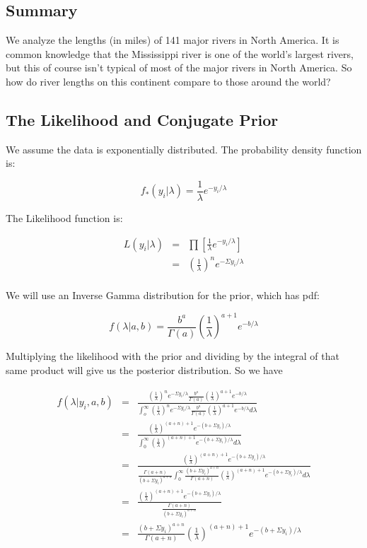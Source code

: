 \documentclass[12pt]{article}
\begin{document}
\subsection{Summary}

\noindent We analyze the lengths (in miles) of 141 major rivers in North America.  It is common knowledge that the Mississippi river is one of the world's largest rivers, but this of course isn't typical of most of the major rivers in North America.  So how do river lengths on this continent compare to those around the world?

\subsection{The Likelihood and Conjugate Prior}

\noindent We assume the data is exponentially distributed.  The probability density function is:

\[f_*(y_i|\lambda)=\frac{1}{\lambda}e^{-y_i/\lambda} \]

\noindent The Likelihood function is:

\begin{eqnarray*}
L(y_i|\lambda) &=& \prod\left[\frac{1}{\lambda}e^{-y_i/\lambda}\right] \\
&=& \left(\frac{1}{\lambda}\right)^ne^{-\Sigma y_i/\lambda} \\
\end{eqnarray*}

\noindent We will use an Inverse Gamma distribution for the prior, which has pdf:

\[f(\lambda|a,b)=\frac{b^a}{\Gamma(a)}\left(\frac{1}{\lambda}\right)^{a+1}e^{-b/\lambda}\]

\noindent Multiplying the likelihood with the prior and dividing by the integral of that same product will give us the posterior distribution.  So we have

\begin{eqnarray*}
f(\lambda|y_i,a,b) &=& \frac{\left(\frac{1}{\lambda}\right)^ne^{-\Sigma y_i/\lambda}\frac{b^a}{\Gamma(a)}\left(\frac{1}{\lambda}\right)^{a+1}e^{-b/\lambda}}{\int_o^\infty \left(\frac{1}{\lambda}\right)^ne^{-\Sigma y_i/\lambda}\frac{b^a}{\Gamma(a)}\left(\frac{1}{\lambda}\right)^{a+1}e^{-b/\lambda}d\lambda} \\
&=& \frac{\left(\frac{1}{\lambda}\right)^{(a+n)+1}e^{-(b+\Sigma y_i)/\lambda}}{\int_0^\infty \left(\frac{1}{\lambda}\right)^{(a+n)+1}e^{-(b+\Sigma y_i)/\lambda}d\lambda} \\
&=& \frac{\left(\frac{1}{\lambda}\right)^{(a+n)+1}e^{-(b+\Sigma y_i)/\lambda}}{\frac{\Gamma(a+n)}{(b+\Sigma y_i)^{a+n}}\int_0^\infty \frac{(b+\Sigma y_i)^{a+n}}{\Gamma(a+n)}\left(\frac{1}{\lambda}\right)^{(a+n)+1}e^{-(b+\Sigma y_i)/\lambda}d\lambda} \\
&=& \frac{\left(\frac{1}{\lambda}\right)^{(a+n)+1}e^{-(b+\Sigma y_i)/\lambda}}{\frac{\Gamma(a+n)}{(b+\Sigma y_i)^{a+n}}} \\
&=& \frac{(b+\Sigma y_i)^{a+n}}{\Gamma(a+n)}\left(\frac{1}{\lambda}\right)^{(a+n)+1}e^{-(b+\Sigma y_i)/\lambda} \\
\end{eqnarray*}
\end{document}
